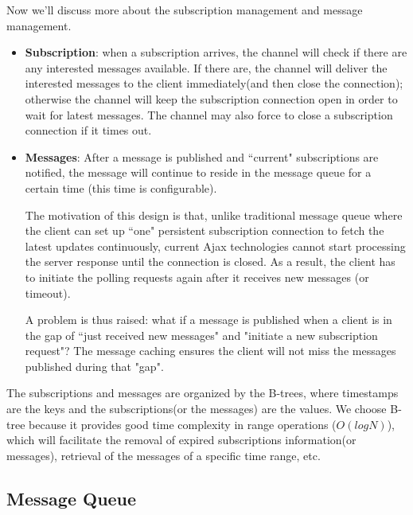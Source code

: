 Now we'll discuss more about the subscription management and message management.
\begin{itemize}
    \item {\bf Subscription}: when a subscription arrives, the channel will
          check if there are any interested messages available. If there are, 
          the channel will deliver the interested messages to the client 
          immediately(and then close the connection); otherwise the channel 
          will keep the subscription 
          connection open in order to wait for latest messages. The channel may
          also force to close a subscription connection if it times out. 
    \item {\bf Messages}: After a message is published and 
            ``current" subscriptions are notified, the message will continue to 
            reside in the message queue for a certain time (this time is 
            configurable). 
            
            The motivation of this design is that, unlike 
            traditional message queue where the client can set up ``one" 
            persistent subscription connection to fetch the latest updates
            continuously, current Ajax technologies cannot start processing
            the server response until the connection is closed. As a result, 
            the client has to initiate the polling requests again after it
            receives new messages (or timeout).

            A problem is thus raised: what if a message is published when a client 
            is in the gap of ``just received new messages" and "initiate a new subscription
            request"? The message caching ensures 
            the client will not miss the messages published during that "gap".
\end{itemize}

The subscriptions and messages are organized by the B-trees\cite{BTree}, where
timestamps are the keys and the subscriptions(or the messages) are the values.
We choose B-tree because it provides good time complexity in range operations
($O(log N)$), which will facilitate the removal of expired subscriptions information(or
messages), retrieval of the messages of a specific time range, etc.

\subsection{Message Queue\\}

